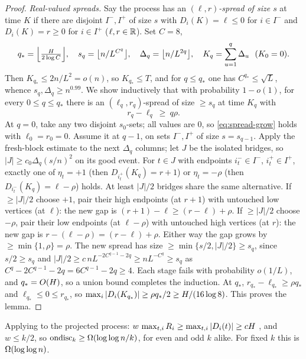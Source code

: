 \begin{proof}
\emph{Real-valued spreads.} Say the process has an \emph{$(\ell,r)$-spread of size $s$} at time $K$ if there are disjoint
$I^-,I^+$ of size $s$ with $D_i(K)=\ell\le0$ for $i\in I^-$ and $D_i(K)=r\ge0$ for $i\in I^+$ ($\ell,r\in\mathbb{R}$). Set $C=8$,
\[
  q_*=\Big\lfloor\tfrac{H}{2\log C}\Big\rfloor,\quad
  s_q=\big\lfloor n/L^{C^q}\big\rfloor,\quad
  \Delta_q=\big\lfloor n/L^{2q}\big\rfloor,\quad K_q=\sum_{u=1}^{q}\Delta_u\ \ (K_0=0).
\]
Then $K_{q_*}\le 2n/L^2=o(n)$, so $K_{q_*}\le T$, and for $q\le q_*$ one has $C^{q_*}\le\sqrt L$, whence $s_q,\Delta_q\ge n^{0.99}$.
We show inductively that with probability $1-o(1)$, for every $0\le q\le q_*$ there is an $(\ell_q,r_q)$-spread of size
$\ge s_q$ at time $K_q$ with
\begin{equation}\label{eq:spread-grow}
  r_q-\ell_q\ \ge\ q\rho .
\end{equation}
At $q=0$, take any two disjoint $s_0$-sets; all values are $0$, so \eqref{eq:spread-grow} holds with $\ell_0=r_0=0$. Assume it
at $q-1$, on sets $I^-,I^+$ of size $s=s_{q-1}$. Apply the fresh-block estimate to the next $\Delta_q$ columns; let $J$ be the
isolated bridges, so $|J|\ge c_0\Delta_q(s/n)^2$ on its good event. For $t\in J$ with endpoints $i_t^-\in I^-$, $i_t^+\in I^+$,
exactly one of $\eta_t=+1$ (then $D_{i_t^+}(K_q)=r+1$) or $\eta_t=-\rho$ (then $D_{i_t^-}(K_q)=\ell-\rho$) holds. At least
$|J|/2$ bridges share the same alternative. If $\ge|J|/2$ choose $+1$, pair their high endpoints (at $r+1$) with untouched low
vertices (at $\ell$): the new gap is $(r+1)-\ell\ge(r-\ell)+\rho$. If $\ge|J|/2$ choose $-\rho$, pair their low endpoints (at
$\ell-\rho$) with untouched high vertices (at $r$): the new gap is $r-(\ell-\rho)=(r-\ell)+\rho$. Either way the gap grows by
$\ge\min\{1,\rho\}=\rho$. The new spread has size $\ge\min\{s/2,|J|/2\}\ge s_q$, since $s/2\ge s_q$ and
$|J|/2\ge c\,nL^{-2C^{q-1}-2q}\ge nL^{-C^q}\ge s_q$ as $C^q-2C^{q-1}-2q=6C^{q-1}-2q\ge4$. Each stage fails with probability
$o(1/L)$, and $q_*=O(H)$, so a union bound completes the induction. At $q_*$, $r_{q_*}-\ell_{q_*}\ge\rho q_*$ and
$\ell_{q_*}\le0\le r_{q_*}$, so $\max_i|D_i(K_{q_*})|\ge\rho q_*/2\ge H/(16\log 8)$. This proves the lemma.
\end{proof}

Applying  to the projected process: $w\,\max_{t,i}R_i\ge\max_{t,i}|D_i(t)|\ge cH$ \whp,
and $w\le k/2$, so $\mathrm{ondisc}_k\ge\Omega(\log\log n/k)$, for even and odd $k$ alike. For fixed $k$ this is $\Omega(\log\log n)$.

